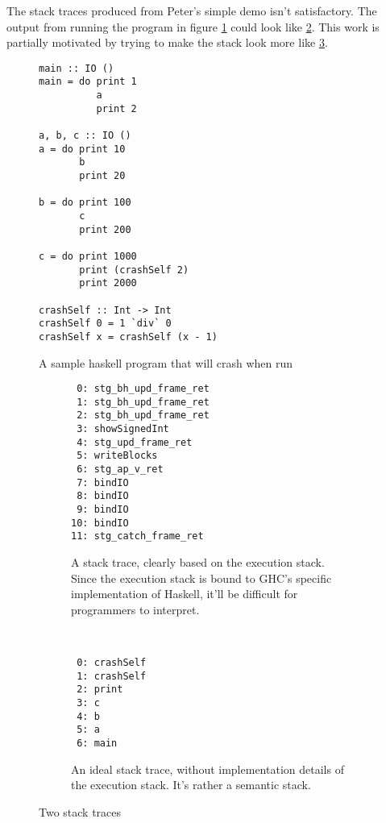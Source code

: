 The stack traces produced from Peter's simple demo isn't satisfactory.
The output from running the program in figure \ref{fig:sample_program}
could look like \ref{fig:trace_goal1}. This work is partially motivated
by trying to make the stack look more like \ref{fig:trace_goal2}.

\begin{figure}
\begin{mdframed}
  \begin{verbatim}
main :: IO ()
main = do print 1
          a
          print 2

a, b, c :: IO ()
a = do print 10
       b
       print 20

b = do print 100
       c
       print 200

c = do print 1000
       print (crashSelf 2)
       print 2000

crashSelf :: Int -> Int
crashSelf 0 = 1 `div` 0
crashSelf x = crashSelf (x - 1)
  \end{verbatim}
  \caption{A sample haskell program that will crash when run}
  \label{fig:sample_program}
\end{mdframed}
\end{figure}




\begin{figure}
\begin{mdframed}
  \begin{subfigure}[t]{0.5\textwidth}
    {\small
    \begin{verbatim}
 0: stg_bh_upd_frame_ret
 1: stg_bh_upd_frame_ret
 2: stg_bh_upd_frame_ret
 3: showSignedInt
 4: stg_upd_frame_ret
 5: writeBlocks
 6: stg_ap_v_ret
 7: bindIO
 8: bindIO
 9: bindIO
10: bindIO
11: stg_catch_frame_ret
    \end{verbatim}
  }%
    \caption{A stack trace, clearly based on the execution stack. Since the
      execution stack is bound to GHC's specific implementation of Haskell,
      it'll be difficult for programmers to interpret.}
    \label{fig:trace_goal1}
  \end{subfigure}
        ~ %
        \begin{subfigure}[t]{0.5\textwidth}
    {\small
          \begin{verbatim}
 0: crashSelf
 1: crashSelf
 2: print
 3: c
 4: b
 5: a
 6: main
          \end{verbatim}
  }%
          \caption{An ideal stack trace, without implementation details of the
            execution stack. It's rather a semantic stack.}
          \label{fig:trace_goal2}
        \end{subfigure}
        \caption{Two stack traces
        }\label{fig:traces}
\end{mdframed}
\end{figure}

